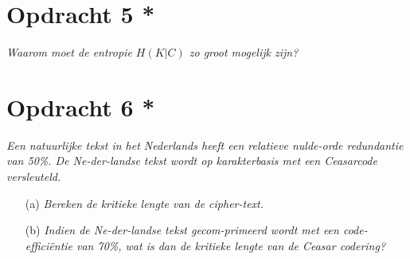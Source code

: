 \section{Opdracht 5 *}
\emph{Waarom moet de entropie $H(K|C)$ zo groot mogelijk zijn?}

\section{Opdracht 6 *}
\emph{Een natuurlijke tekst in het Nederlands heeft een relatieve nulde-orde redundantie van 50\%. De Ne-der-landse tekst wordt op karakterbasis met een Ceasarcode versleuteld.}\\
\begin{itemize}
  \item[(a)] \emph{Bereken de kritieke lengte van de cipher-text.}
  \item[(b)] \emph{Indien de Ne-der-landse tekst gecom-primeerd wordt met een code-effici\"{e}ntie van 70\%, wat is dan de kritieke lengte van de Ceasar codering?}
\end{itemize}
